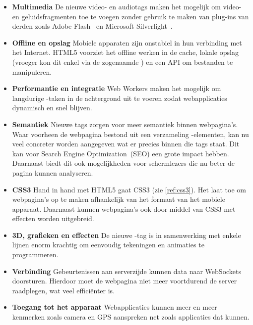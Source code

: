 \begin{itemize}
\item \textbf{Multimedia} 
De nieuwe video- en audiotags maken het mogelijk om video- en geluidsfragmenten toe te voegen zonder gebruik te maken van plug-ins van derden zoals Adobe Flash~\cite{Adobe2013} en Microsoft Silverlight~\cite{Microsoft2013}.

\item \textbf{Offline en opslag}  
Mobiele apparaten zijn onstabiel in hun verbinding met het Internet. HTML5 voorziet het offline werken in de cache, lokale opslag (vroeger kon dit enkel via de zogenaamde ) en een API om bestanden te manipuleren.

\item \textbf{Performantie en integratie}
Web Workers maken het mogelijk om langdurige \js{}-taken in de achtergrond uit te voeren zodat webapplicaties dynamisch en snel blijven.

\item \textbf{Semantiek}
Nieuwe tags zorgen voor meer semantiek binnen webpagina's. 
Waar voorheen de webpagina bestond uit een verzameling -elementen, kan nu veel concreter worden aangegeven wat er precies binnen die tags staat. 
Dit kan voor Search Engine Optimization~(SEO) een grote impact hebben. 
Daarnaast biedt dit ook mogelijkheden voor schermlezers die nu beter de pagina kunnen analyseren.

\item \textbf{CSS3}
Hand in hand met HTML5 gaat CSS3 (zie \ref{ref:css3}). 
Het laat toe om webpagina's op te maken afhankelijk van het formaat van het mobiele apparaat. 
Daarnaast kunnen webpagina's ook door middel van CSS3 met effecten worden uitgebreid. 

\item \textbf{3D, grafieken en effecten}
De nieuwe -tag is in samenwerking met enkele lijnen \js{} enorm krachtig om eenvoudig tekeningen en animaties te programmeren.

\item \textbf{Verbinding}
Gebeurtenissen aan serverzijde kunnen data naar WebSockets doorsturen. 
Hierdoor moet de webpagina niet meer voortdurend de server raadplegen, wat veel efficiënter is.

\item \textbf{Toegang tot het apparaat}
Webapplicaties kunnen meer en meer kenmerken zoals camera en GPS aanspreken net zoals  applicaties dat kunnen. 
\end{itemize}

